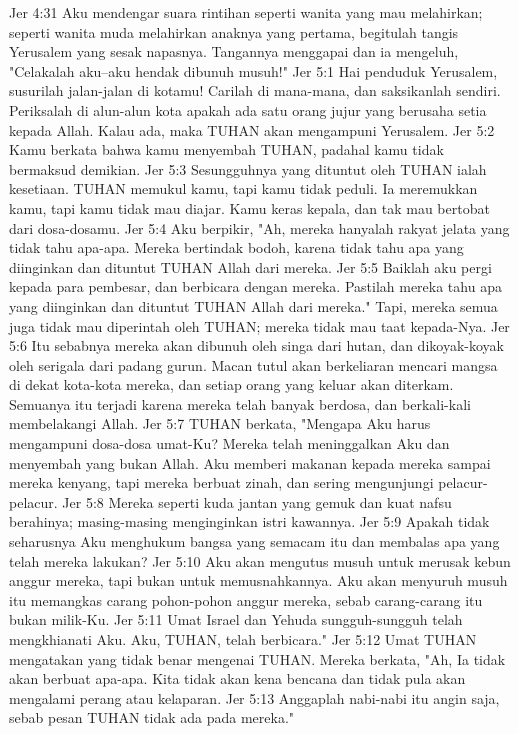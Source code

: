 Jer 4:31  Aku mendengar suara rintihan seperti wanita yang mau melahirkan; seperti wanita muda melahirkan anaknya yang pertama, begitulah tangis Yerusalem yang sesak napasnya. Tangannya menggapai dan ia mengeluh, "Celakalah aku--aku hendak dibunuh musuh!"
Jer 5:1  Hai penduduk Yerusalem, susurilah jalan-jalan di kotamu! Carilah di mana-mana, dan saksikanlah sendiri. Periksalah di alun-alun kota apakah ada satu orang jujur yang berusaha setia kepada Allah. Kalau ada, maka TUHAN akan mengampuni Yerusalem.
Jer 5:2  Kamu berkata bahwa kamu menyembah TUHAN, padahal kamu tidak bermaksud demikian.
Jer 5:3  Sesungguhnya yang dituntut oleh TUHAN ialah kesetiaan. TUHAN memukul kamu, tapi kamu tidak peduli. Ia meremukkan kamu, tapi kamu tidak mau diajar. Kamu keras kepala, dan tak mau bertobat dari dosa-dosamu.
Jer 5:4  Aku berpikir, "Ah, mereka hanyalah rakyat jelata yang tidak tahu apa-apa. Mereka bertindak bodoh, karena tidak tahu apa yang diinginkan dan dituntut TUHAN Allah dari mereka.
Jer 5:5  Baiklah aku pergi kepada para pembesar, dan berbicara dengan mereka. Pastilah mereka tahu apa yang diinginkan dan dituntut TUHAN Allah dari mereka." Tapi, mereka semua juga tidak mau diperintah oleh TUHAN; mereka tidak mau taat kepada-Nya.
Jer 5:6  Itu sebabnya mereka akan dibunuh oleh singa dari hutan, dan dikoyak-koyak oleh serigala dari padang gurun. Macan tutul akan berkeliaran mencari mangsa di dekat kota-kota mereka, dan setiap orang yang keluar akan diterkam. Semuanya itu terjadi karena mereka telah banyak berdosa, dan berkali-kali membelakangi Allah.
Jer 5:7  TUHAN berkata, "Mengapa Aku harus mengampuni dosa-dosa umat-Ku? Mereka telah meninggalkan Aku dan menyembah yang bukan Allah. Aku memberi makanan kepada mereka sampai mereka kenyang, tapi mereka berbuat zinah, dan sering mengunjungi pelacur-pelacur.
Jer 5:8  Mereka seperti kuda jantan yang gemuk dan kuat nafsu berahinya; masing-masing menginginkan istri kawannya.
Jer 5:9  Apakah tidak seharusnya Aku menghukum bangsa yang semacam itu dan membalas apa yang telah mereka lakukan?
Jer 5:10  Aku akan mengutus musuh untuk merusak kebun anggur mereka, tapi bukan untuk memusnahkannya. Aku akan menyuruh musuh itu memangkas carang pohon-pohon anggur mereka, sebab carang-carang itu bukan milik-Ku.
Jer 5:11  Umat Israel dan Yehuda sungguh-sungguh telah mengkhianati Aku. Aku, TUHAN, telah berbicara."
Jer 5:12  Umat TUHAN mengatakan yang tidak benar mengenai TUHAN. Mereka berkata, "Ah, Ia tidak akan berbuat apa-apa. Kita tidak akan kena bencana dan tidak pula akan mengalami perang atau kelaparan.
Jer 5:13  Anggaplah nabi-nabi itu angin saja, sebab pesan TUHAN tidak ada pada mereka."

